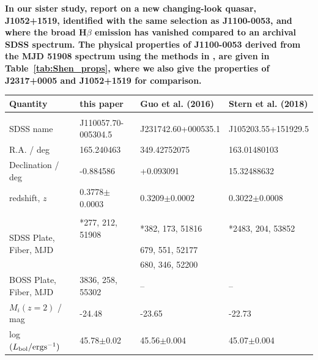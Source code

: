 \documentclass[a4paper,fleqn,usenatbib]{mnras}
\begin{document}
{\bf In our sister study, \citet{Stern2018} report on a new
changing-look quasar, J1052+1519, identified with the same selection
as J1100-0053, and where the broad H$\beta$ emission has vanished
compared to an archival SDSS spectrum. The physical properties of
J1100-0053 derived from the MJD 51908 spectrum using the methods in
\citet{Shen2011}, are given in Table~\ref{tab:Shen_props}, where we
also give the properties of J2317+0005 \citep{Guo2016} and J1052+1519
\citep{Stern2018} for comparison.}

\begin{table}
 \centering
 \begin{tabular}{l l l l}
  \hline \hline 
 Quantity                                          &     this paper                       &  Guo et al. (2016)              & Stern et al. (2018) \\
 \hline 
    &&\\
    SDSS name                                       &    J110057.70-005304.5    &  J231742.60+000535.1    & J105203.55+151929.5 \\
    R.A. / deg                                        &  165.240463                       &  349.42752075                &   163.01480103  \\
    Declination / deg                            &   -0.884586                        &   +0.093091                    & 15.32488632 \\
   redshift, $z$                                    &   0.3778$\pm$0.0003        & 0.3209$\pm$0.0002       & 0.3022$\pm$0.0008\\
    &&\\ 
    \multirow{3}{*}{SDSS Plate, Fiber, MJD }  &  	*277, 212,   51908    &  *382, 173, 51816         & *2483, 204, 53852 \\
    &                                           & 679, 551, 52177              & \\    
    &                                           & 680, 346, 52200             & \\
    BOSS Plate, Fiber, MJD                 & 	3836, 258, 55302          	    &    --                                & -- \\
    $M_{i}(z=2)$  / mag                          &   -24.48                             & -23.65                           & -22.73 \\
    log $(L_{\rm bol} / {\rm erg s}^{-1}) $  &   45.78$\pm$0.02               & 45.56$\pm$0.004      & 45.07$\pm$0.004 \\

\end{tabular}
\end{table}
\end{document}
